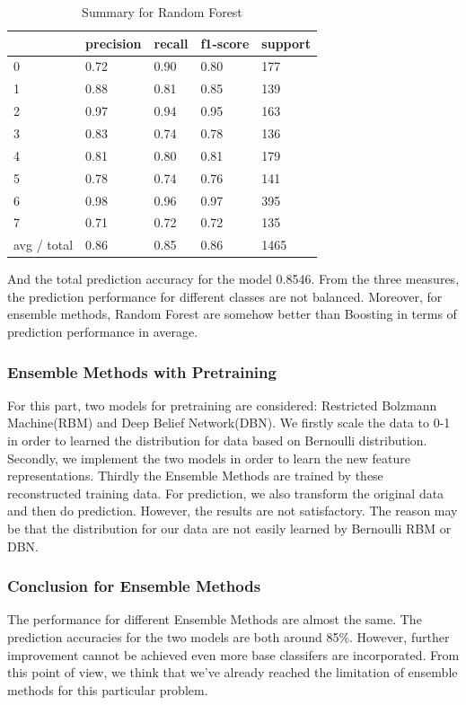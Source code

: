 \documentclass[paper=a4, fontsize=11pt]{scrartcl}
\begin{document}
\begin{table}[ht]
\centering
\caption{Summary for Random Forest}
\begin{tabular}{lllll}
\hline
            & precision & recall & f1-score & support \\ \hline
0           & 0.72      & 0.90   & 0.80     & 177     \\
1           & 0.88      & 0.81   & 0.85     & 139     \\
2           & 0.97      & 0.94   & 0.95     & 163     \\
3           & 0.83      & 0.74   & 0.78     & 136     \\
4           & 0.81      & 0.80   & 0.81     & 179     \\
5           & 0.78      & 0.74   & 0.76     & 141     \\
6           & 0.98      & 0.96   & 0.97     & 395     \\
7           & 0.71      & 0.72   & 0.72     & 135     \\ \hline
avg / total & 0.86      & 0.85   & 0.86     & 1465    \\ \hline
\end{tabular}
\end{table}

And the total prediction accuracy for the model 0.8546. From the three measures, the prediction performance for different classes are not balanced. Moreover, for ensemble methods, Random Forest are somehow better than Boosting in terms of prediction performance in average.

\subsubsection*{Ensemble Methods with Pretraining}
For this part, two models for pretraining are considered: Restricted Bolzmann Machine(RBM) and Deep Belief Network(DBN). We firstly scale the data to 0-1 in order to learned the distribution for data based on Bernoulli distribution. Secondly, we implement the two models in order to learn the new feature representations. Thirdly the Ensemble Methods are trained by these reconstructed training data. For prediction, we also transform the original data and then do prediction. However, the results are not satisfactory. The reason may be that the distribution for our data are not easily learned by Bernoulli RBM or DBN.

\subsubsection*{Conclusion for Ensemble Methods}
The performance for different Ensemble Methods are almost the same. The prediction accuracies for the two models are both around 85\%. However, further improvement cannot be achieved even more base classifers are incorporated. From this point of view, we think that we've already reached the limitation of ensemble methods for this particular problem.
\end{document}
